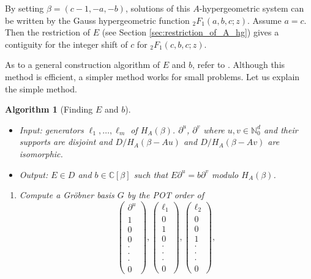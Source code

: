 \documentclass{article}
\def\CC{\mathbb{C}}
\def\NN{\mathbb{N}}
\def\pd#1{\partial_{#1}}
\newtheorem{algorithm}{Algorithm}
\begin{document}
By setting $\beta=(c-1,-a,-b)$, solutions of this $A$-hypergeometric
system can be written by the Gauss hypergeometric function
${}_2F_1(a,b,c;z)$.
Assume $a=c$. Then the restriction of $E$ (see Section \ref{sec:restriction_of_A_hg}) gives a contiguity
for the integer shift of $c$ for ${}_2F_1(c,b,c;z)$.

As to a general construction algorithm of $E$ and $b$, 
refer to \cite{saito-isom}.
Although this method is efficient, a simpler method works for small problems.
Let us explain the simple method.
\begin{algorithm}[Finding $E$ and $b$]  \ 
\begin{itemize}
\item Input: generators $\ell_1, \ldots, \ell_m$ of $H_A(\beta)$. $\pd{}^u$, $\pd{}^v$
where $u, v \in \NN_0^d$ and their supports are disjoint and
$D/H_A(\beta-Au)$ and $D/H_A(\beta-Av)$ are isomorphic. 
\item Output: $E \in D$ and $b \in \CC[\beta]$ such that
$E \pd{}^u = b \pd{}^v$ modulo $H_A(\beta)$.
\end{itemize}
\begin{enumerate}
\item Compute a Gr\"obner basis $G$ by the POT order of
\begin{equation}
 \left( \begin{array}{c}\pd{}^u\\ 1\\ 0\\ 0\\ \cdot\\ \cdot\\ \cdot\\ 0\end{array} \right),
 \left( \begin{array}{c}\ell_1\\ 0\\ 1\\ 0\\ \cdot\\ \cdot\\ \cdot\\ 0\end{array} \right),
 \left( \begin{array}{c}\ell_2\\ 0\\ 0\\ 1\\ \cdot\\ \cdot\\ \cdot\\ 0\end{array} \right),

\end{equation}
\end{enumerate}
\end{algorithm}
\end{document}
